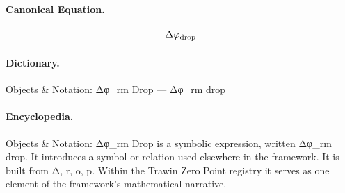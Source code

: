 \paragraph{Canonical Equation.}
\[
\Delta\varphi_{\rm drop}
\]

\paragraph{Dictionary.}
Objects \& Notation: Δφ\_rm Drop — Δφ\_rm drop

\paragraph{Encyclopedia.}
Objects \& Notation: Δφ\_rm Drop is a symbolic expression, written Δφ\_rm drop. It introduces a symbol or relation used elsewhere in the framework. It is built from Δ, r, o, p. Within the Trawin Zero Point registry it serves as one element of the framework's mathematical narrative.
